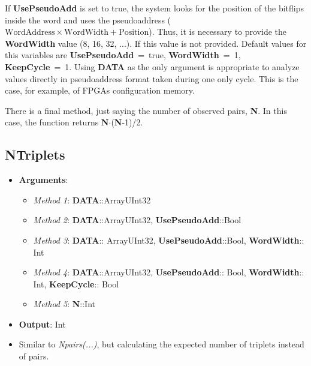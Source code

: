 \begin{itemize}
	If \textbf{UsePseudoAdd} is set to true, the system looks for the position of the bitflips inside the word and uses the pseudoaddress (\(\text{WordAddress}\times\text{WordWidth}+\text{Position}\)). Thus, it is necessary to provide the \textbf{WordWidth} value (8, 16, 32, ...). If this value is not provided. Default values for this variables are \textbf{UsePseudoAdd}~=~true, \textbf{WordWidth}~=~1, \textbf{KeepCycle}~=~1. Using \textbf{DATA} as the only argument is appropriate to analyze values directly in pseudoaddress format taken during one only cycle. This is the case, for example, of FPGAs configuration memory. 
	
	There is a final method, just saying the number of observed pairs, \textbf{N}. In this case, the function returns \textbf{N}\(\cdot\)(\textbf{N}-1)/2.
	
\end{itemize}
%
\subsection*{NTriplets}
\begin{itemize}
	\item \textbf{Arguments}:
	\begin{itemize}
		\item \textit{Method 1}: \textbf{DATA}::Array{UInt32}
		\item \textit{Method 2}: \textbf{DATA}::Array{UInt32}, \textbf{UsePseudoAdd}::Bool
		\item \textit{Method 3}: \textbf{DATA}:: Array{UInt32}, \textbf{UsePseudoAdd}::Bool, \textbf{WordWidth}:: Int
		\item \textit{Method 4}: \textbf{DATA}::Array{UInt32}, \textbf{UsePseudoAdd}:: Bool, \textbf{WordWidth}:: Int, \textbf{KeepCycle}:: Bool
		\item \textit{Method 5}: \textbf{N}::Int
	\end{itemize}
	\item \textbf{Output}: Int
	\item Similar to \textit{Npairs(...)}, but calculating the expected number of triplets instead of pairs.
\end{itemize}